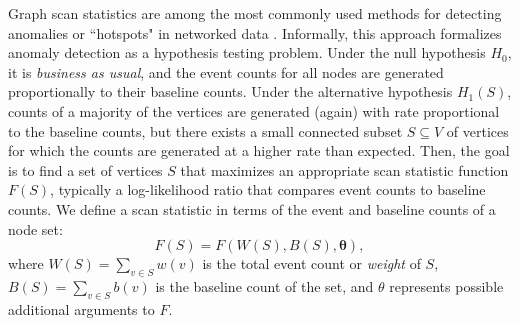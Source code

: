 Graph scan statistics are among the most commonly used methods for detecting anomalies or ``hotspots" in
networked data \cite{Speakman-14,leiserson2015pan, hansen2016finding, neil2013scan, chen2014non}.
Informally, this approach formalizes anomaly detection as a hypothesis testing problem.
Under the null hypothesis $H_0$, it is \emph{business as usual}, and the event counts for all nodes are generated proportionally to their baseline counts. Under the alternative hypothesis $H_1(S)$, counts of a majority of
the vertices are generated (again) with rate proportional to the baseline counts, but there exists a small connected subset
$S \subseteq V$ of vertices for which the counts are generated at a higher rate than expected.
Then, the goal is to find a set of vertices $S$ that maximizes an appropriate scan statistic function $F(S)$, typically a log-likelihood ratio that compares event counts to baseline counts. We define a scan statistic in terms of the event and baseline counts of a node set:
$$
F(S) = F(W(S), B(S), \mathbf{\theta}),
$$
where $W(S) = \sum_{v \in S} w(v)$ is the total event count or \emph{weight} of $S$, $B(S) = \sum_{v \in S} b(v)$ is the baseline count of the set, and $\theta$ represents possible additional arguments to $F$.



